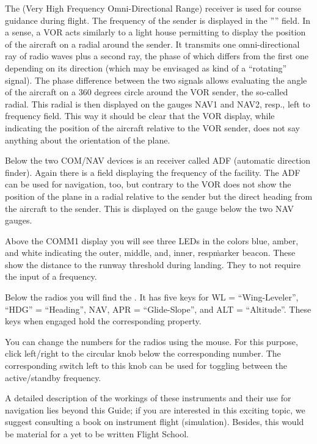 The  (Very High Frequency Omni-Directional Range) receiver is used for course
guidance during flight. The frequency of the sender is displayed in the '''' field. In a sense, a VOR acts similarly to a light house permitting to display the position of the
aircraft on a radial around the sender. It transmits one omni-directional ray of radio
waves plus a second ray, the phase of which differs from the first one depending on its
direction (which may be envisaged as kind of a ``rotating'' signal). The phase difference between the two signals allows evaluating the angle of the aircraft on a 360 degrees circle
around the VOR sender, the so-called radial. This radial is then displayed on the gauges
NAV1 and NAV2, resp., left to frequency field. This way it should be clear that the VOR display, while indicating the position of the aircraft relative to the VOR sender, does not say anything about the orientation of the plane. 

Below the two COM/NAV devices is an  receiver called ADF (automatic direction
finder). Again there is a field displaying the frequency of the facility. The ADF can be
used for navigation, too, but contrary to the VOR does not show the position of the plane
in a radial relative to the sender but the direct heading from the aircraft to the
sender. This is displayed on the gauge below the two NAV gauges.

Above the COMM1 display you will see three LEDs in the colors blue, amber, and white
indicating the outer, middle, and, inner, resp\. marker beacon. These show the distance to the runway
threshold during landing. They to not require the input of a frequency. 

Below the radios you will find the . It has five keys
for WL = ``Wing-Leveler'', ``HDG'' = ``Heading'', NAV, APR =
``Glide-Slope'', and ALT = ``Altitude''. These keys when engaged hold
the corresponding property.

You can change the numbers for the radios using the mouse. For this
purpose, click left/right to the circular knob below the corresponding
number. The corresponding switch left to this knob can be used for
toggling between the active/standby frequency.

A detailed description of the workings of these instruments and their use for navigation
lies beyond this Guide; if you are interested in this exciting topic, we suggest
consulting a book on instrument flight (simulation). Besides, this would be material for
a yet to be written \FlightGear{} Flight School. 

